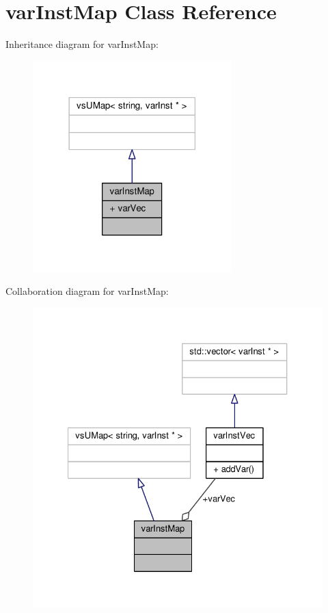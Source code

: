 \hypertarget{classvarInstMap}{}\section{var\+Inst\+Map Class Reference}
\label{classvarInstMap}


Inheritance diagram for var\+Inst\+Map\+:
\nopagebreak
\begin{figure}[H]
\begin{center}
\leavevmode
\includegraphics[width=218pt]{d0/d14/classvarInstMap__inherit__graph}
\end{center}
\end{figure}


Collaboration diagram for var\+Inst\+Map\+:
\nopagebreak
\begin{figure}[H]
\begin{center}
\leavevmode
\includegraphics[width=327pt]{d2/d00/classvarInstMap__coll__graph}
\end{center}
\end{figure}
